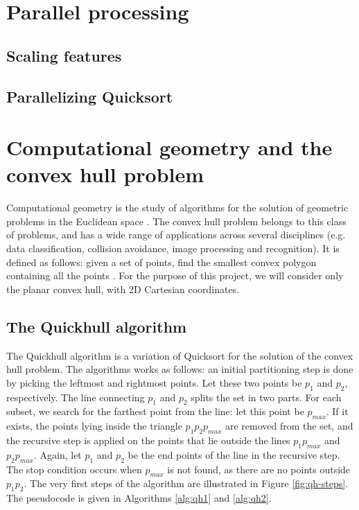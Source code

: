 \documentclass[]{finalproject}
\begin{document}
\section{Parallel processing}
\subsection{Scaling features}
\subsection{Parallelizing Quicksort}

\section{Computational geometry and the convex hull problem}
Computational geometry is the study of algorithms for the solution of geometric problems in the Euclidean space \cite{jaja2000perspective}.
The convex hull problem belongs to this class of problems, and has a wide range of applications across several disciplines
(e.g. data classification, collision avoidance, image processing and recognition). It is defined as follows:
given a set of points, find the smallest convex polygon containing all the points \cite{geowiki}.
For the purpose of this project, we will consider only the planar convex hull, with 2D Cartesian coordinates.

\subsection{The Quickhull algorithm}
The Quickhull algorithm is a variation of Quicksort for the solution of the convex hull problem.
The algorithms works as follows:
an initial partitioning step is done by picking the leftmost and rightmost points.
Let these two points be $p_1$ and $p_2$, respectively.
The line connecting $p_1$ and $p_2$ splits the set in two parts.
For each subset, we search for the farthest point from the line: let this point be $p_{max}$.
If it exists, the points lying inside the triangle $p_1p_2p_{max}$ are removed from the set,
and the recursive step is applied on the points that lie outside the lines $p_1p_{max}$ and $p_2p_{max}$.
Again, let $p_1$ and $p_2$ be the end points of the line in the recursive step.
The stop condition occurs when $p_{max}$ is not found, as there are no points outside $p_1p_2$.
The very first steps of the algorithm are illustrated in Figure \ref{fig:qh-steps}.
The pseudocode is given in Algorithms \ref{alg:qh1} and \ref{alg:qh2}.
\end{document}
